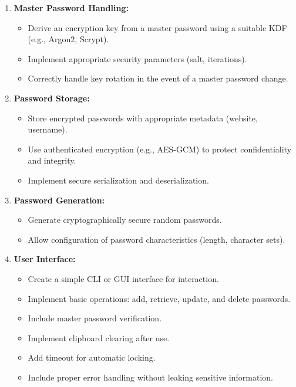 \documentclass[10pt,a4paper,american]{article}
\begin{document}
\begin{enumerate}
	\item \textbf{Master Password Handling:}
	      \begin{itemize}
		      \item Derive an encryption key from a master password using a suitable KDF (e.g., Argon2, Scrypt).
		      \item Implement appropriate security parameters (salt, iterations).
		      \item Correctly handle key rotation in the event of a master password change.
	      \end{itemize}

	\item \textbf{Password Storage:}
	      \begin{itemize}
		      \item Store encrypted passwords with appropriate metadata (website, username).
		      \item Use authenticated encryption (e.g., AES-GCM) to protect confidentiality and integrity.
		      \item Implement secure serialization and deserialization.
	      \end{itemize}

	\item \textbf{Password Generation:}
	      \begin{itemize}
		      \item Generate cryptographically secure random passwords.
		      \item Allow configuration of password characteristics (length, character sets).
	      \end{itemize}

	\item \textbf{User Interface:}
	      \begin{itemize}
		      \item Create a simple CLI or GUI interface for interaction.
		      \item Implement basic operations: add, retrieve, update, and delete passwords.
		      \item Include master password verification.
		      \item Implement clipboard clearing after use.
		      \item Add timeout for automatic locking.
		      \item Include proper error handling without leaking sensitive information.
	      \end{itemize}
\end{enumerate}
\end{document}
